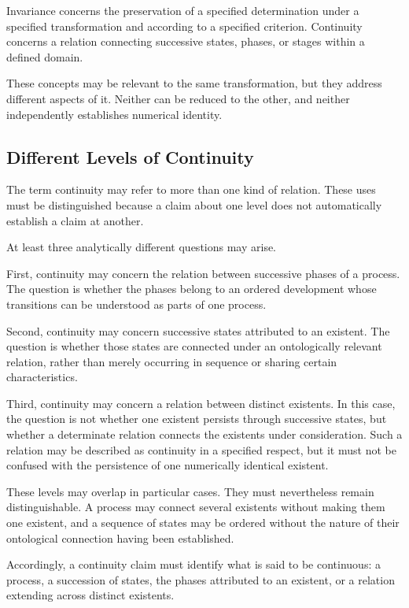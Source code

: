 Invariance concerns the preservation of a specified
determination under a specified transformation and
according to a specified criterion. Continuity concerns
a relation connecting successive states, phases, or
stages within a defined domain.

These concepts may be relevant to the same transformation,
but they address different aspects of it. Neither can
be reduced to the other, and neither independently
establishes numerical identity.

\subsection{Different Levels of Continuity}

The term continuity may refer to more than one kind
of relation. These uses must be distinguished because
a claim about one level does not automatically establish
a claim at another.

At least three analytically different questions may arise.

First, continuity may concern the relation between
successive phases of a process. The question is whether
the phases belong to an ordered development whose
transitions can be understood as parts of one process.

Second, continuity may concern successive states
attributed to an existent. The question is whether
those states are connected under an ontologically
relevant relation, rather than merely occurring in
sequence or sharing certain characteristics.

Third, continuity may concern a relation between
distinct existents. In this case, the question is not
whether one existent persists through successive states,
but whether a determinate relation connects the
existents under consideration. Such a relation may
be described as continuity in a specified respect,
but it must not be confused with the persistence
of one numerically identical existent.

These levels may overlap in particular cases. They
must nevertheless remain distinguishable. A process
may connect several existents without making them
one existent, and a sequence of states may be ordered
without the nature of their ontological connection
having been established.

Accordingly, a continuity claim must identify what
is said to be continuous: a process, a succession
of states, the phases attributed to an existent, or
a relation extending across distinct existents.

